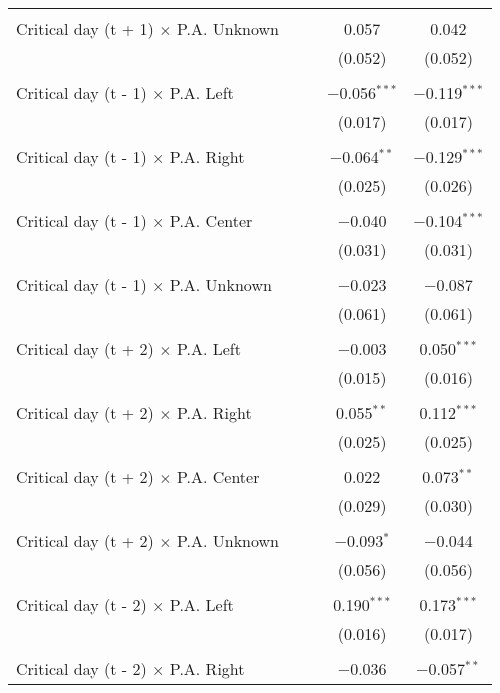 \documentclass[
]{article}
\begin{document}
\begin{table}[!htbp]
{\begin{tabular}{@{\extracolsep{5pt}}lcccc}
  & & & & \\ 
 Critical day (t + 1) $\times$ P.A. Unknown &  &  & 0.057 & 0.042 \\ 
  &  &  & (0.052) & (0.052) \\ 
  & & & & \\ 
 Critical day (t - 1) $\times$ P.A. Left &  &  & $-$0.056$^{***}$ & $-$0.119$^{***}$ \\ 
  &  &  & (0.017) & (0.017) \\ 
  & & & & \\ 
 Critical day (t - 1) $\times$ P.A. Right &  &  & $-$0.064$^{**}$ & $-$0.129$^{***}$ \\ 
  &  &  & (0.025) & (0.026) \\ 
  & & & & \\ 
 Critical day (t - 1) $\times$ P.A. Center &  &  & $-$0.040 & $-$0.104$^{***}$ \\ 
  &  &  & (0.031) & (0.031) \\ 
  & & & & \\ 
 Critical day (t - 1) $\times$ P.A. Unknown &  &  & $-$0.023 & $-$0.087 \\ 
  &  &  & (0.061) & (0.061) \\ 
  & & & & \\ 
 Critical day (t + 2) $\times$ P.A. Left &  &  & $-$0.003 & 0.050$^{***}$ \\ 
  &  &  & (0.015) & (0.016) \\ 
  & & & & \\ 
 Critical day (t + 2) $\times$ P.A. Right &  &  & 0.055$^{**}$ & 0.112$^{***}$ \\ 
  &  &  & (0.025) & (0.025) \\ 
  & & & & \\ 
 Critical day (t + 2) $\times$ P.A. Center &  &  & 0.022 & 0.073$^{**}$ \\ 
  &  &  & (0.029) & (0.030) \\ 
  & & & & \\ 
 Critical day (t + 2) $\times$ P.A. Unknown &  &  & $-$0.093$^{*}$ & $-$0.044 \\ 
  &  &  & (0.056) & (0.056) \\ 
  & & & & \\ 
 Critical day (t - 2) $\times$ P.A. Left &  &  & 0.190$^{***}$ & 0.173$^{***}$ \\ 
  &  &  & (0.016) & (0.017) \\ 
  & & & & \\ 
 Critical day (t - 2) $\times$ P.A. Right &  &  & $-$0.036 & $-$0.057$^{**}$ \\ 

\end{tabular}}
\end{table}
\end{document}
